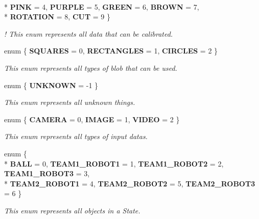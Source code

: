\begin{DoxyCompactItemize}
\\*
{\bfseries P\-I\-N\-K} = 4, 
{\bfseries P\-U\-R\-P\-L\-E} = 5, 
{\bfseries G\-R\-E\-E\-N} = 6, 
{\bfseries B\-R\-O\-W\-N} = 7, 
\\*
{\bfseries R\-O\-T\-A\-T\-I\-O\-N} = 8, 
{\bfseries C\-U\-T} = 9
 \}
\begin{DoxyCompactList}\small\item\em ! This enum represents all data that can be calibrated. \end{DoxyCompactList}\item 
enum \{ {\bfseries S\-Q\-U\-A\-R\-E\-S} = 0, 
{\bfseries R\-E\-C\-T\-A\-N\-G\-L\-E\-S} = 1, 
{\bfseries C\-I\-R\-C\-L\-E\-S} = 2
 \}
\begin{DoxyCompactList}\small\item\em This enum represents all types of blob that can be used. \end{DoxyCompactList}\item 
enum \{ {\bfseries U\-N\-K\-N\-O\-W\-N} = -\/1
 \}
\begin{DoxyCompactList}\small\item\em This enum represents all unknown things. \end{DoxyCompactList}\item 
enum \{ {\bfseries C\-A\-M\-E\-R\-A} = 0, 
{\bfseries I\-M\-A\-G\-E} = 1, 
{\bfseries V\-I\-D\-E\-O} = 2
 \}
\begin{DoxyCompactList}\small\item\em This enum represents all types of input datas. \end{DoxyCompactList}\item 
enum \{ \\*
{\bfseries B\-A\-L\-L} = 0, 
{\bfseries T\-E\-A\-M1\-\_\-\-R\-O\-B\-O\-T1} = 1, 
{\bfseries T\-E\-A\-M1\-\_\-\-R\-O\-B\-O\-T2} = 2, 
{\bfseries T\-E\-A\-M1\-\_\-\-R\-O\-B\-O\-T3} = 3, 
\\*
{\bfseries T\-E\-A\-M2\-\_\-\-R\-O\-B\-O\-T1} = 4, 
{\bfseries T\-E\-A\-M2\-\_\-\-R\-O\-B\-O\-T2} = 5, 
{\bfseries T\-E\-A\-M2\-\_\-\-R\-O\-B\-O\-T3} = 6
 \}
\begin{DoxyCompactList}\small\item\em This enum represents all objects in a State. \end{DoxyCompactList}\end{DoxyCompactItemize}
